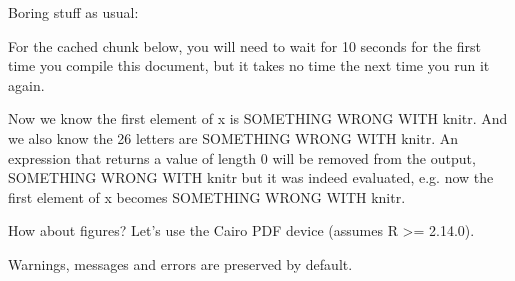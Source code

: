 \documentclass{article}
\newcommand{\rinline}[1]{SOMETHING WRONG WITH knitr}
\begin{document}
Boring stuff as usual:

%

For the cached chunk below, you will need to wait for 10 seconds for
the first time you compile this document, but it takes no time the
next time you run it again.

% 

Now we know the first element of x is \rinline{x[1]}. And we also know
the 26 letters are \rinline{LETTERS}. An expression that returns a
value of length 0 will be removed from the output, \rinline{x[1] =
  2011; NULL} but it was indeed evaluated, e.g. now the first element
of x becomes \rinline{x[1]}.

How about figures? Let's use the Cairo PDF device (assumes R >=
2.14.0).


Warnings, messages and errors are preserved by default.

\end{document}
